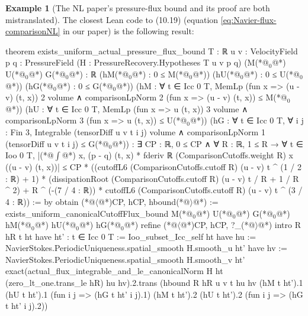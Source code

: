 \documentclass[10pt, a4paper, reqno]{amsart}
\numberwithin{equation}{section}
\theoremstyle{definition}
\newtheorem{example}[theorem]{Example}
\theoremstyle{definition}
\begin{document}
\begin{example}[The NL paper's pressure-flux bound and its proof are both mistranslated]
The closest Lean code to (10.19) (equation \eqref{eq:Navier-flux-comparisonNL} in our paper) is the following result:
\begin{lstlistingleansmall}
theorem exists_uniform_actual_pressure_flux_bound {T : ℝ} {u v : VelocityField}
    {p q : PressureField} (H : PressureRecovery.Hypotheses T u v p q)
    (M(*@\ensuremath{{}_0}@*) U(*@\ensuremath{{}_0}@*) G(*@\ensuremath{{}_0}@*) : ℝ (hM(*@\ensuremath{{}_0}@*) : 0 ≤ M(*@\ensuremath{{}_0}@*)) (hU(*@\ensuremath{{}_0}@*) : 0 ≤ U(*@\ensuremath{{}_0}@*)) (hG(*@\ensuremath{{}_0}@*) : 0 ≤ G(*@\ensuremath{{}_0}@*))
    (hM : ∀ t ∈ Icc 0 T, MemLp (fun x => (u - v) (t, x)) 2 volume ∧
      comparisonLpNorm 2 (fun x => (u - v) (t, x)) ≤ M(*@\ensuremath{{}_0}@*))
    (hU : ∀ t ∈ Icc 0 T, MemLp (fun x => u (t, x)) 3 volume ∧
      comparisonLpNorm 3 (fun x => u (t, x)) ≤ U(*@\ensuremath{{}_0}@*))
    (hG : ∀ t ∈ Icc 0 T, ∀ i j : Fin 3,
      Integrable (tensorDiff u v t i j) volume ∧ comparisonLpNorm 1 (tensorDiff u v t i j) ≤ G(*@\ensuremath{{}_0}@*)) :
    ∃ CP : ℝ, 0 ≤ CP ∧ ∀ R : ℝ, 1 ≤ R → ∀ t ∈ Ioo 0 T,
      |(*@\ensuremath{\int}@*) x, (p - q) (t, x) * fderiv ℝ (ComparisonCutoffs.weight R) x ((u - v) (t, x))| ≤ CP *
        ((cutoffL6 (ComparisonCutoffs.cutoff R) (u - v) t ^ (1 / 2 : ℝ) + 1) *
          (dissipationRoot (ComparisonCutoffs.cutoff R) (u - v) t / R + 1 / R ^ 2) +
          R ^ (-(7 / 4 : ℝ)) * cutoffL6 (ComparisonCutoffs.cutoff R) (u - v) t ^ (3 / 4 : ℝ)) := by
obtain (*@\ensuremath{\langle}@*)CP, hCP, hbound(*@\ensuremath{\rangle}@*) := exists_uniform_canonicalCutoffFlux_bound M(*@\ensuremath{{}_0}@*) U(*@\ensuremath{{}_0}@*) G(*@\ensuremath{{}_0}@*) hM(*@\ensuremath{{}_0}@*) hU(*@\ensuremath{{}_0}@*) hG(*@\ensuremath{{}_0}@*)
refine (*@\ensuremath{\langle}@*)CP, hCP, ?_(*@\ensuremath{\rangle}@*)
intro R hR t ht
have ht' : t ∈ Icc 0 T := Ioo_subset_Icc_self ht
have hu := NavierStokes.PeriodicUniqueness.spatial_smooth H.smooth_u ht'
have hv := NavierStokes.PeriodicUniqueness.spatial_smooth H.smooth_v ht'
exact(actual_flux_integrable_and_le_canonicalNorm H ht (zero_lt_one.trans_le hR) hu hv).2.trans
  (hbound R hR u v t hu hv (hM t ht').1 (hU t ht').1 (fun i j => (hG t ht' i j).1)
    (hM t ht').2 (hU t ht').2 (fun i j => (hG t ht' i j).2))
\end{lstlistingleansmall}


\end{example}
\end{document}
